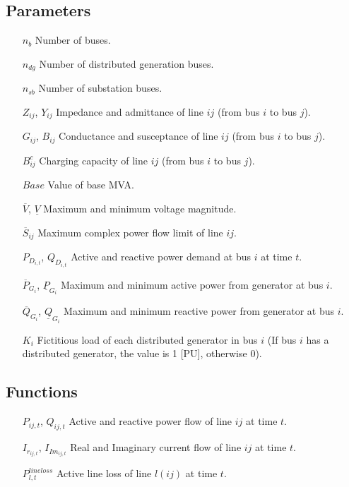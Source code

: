 \documentclass{article}
\begin{document}
\subsection*{Parameters}
\begin{itemize}
\item[$n_{b}$] Number of buses.
\item[$n_{dg}$] Number of distributed generation buses.
\item[$n_{sb}$] Number of substation buses.
\item[$Z_{ij}$, $Y_{ij}$] Impedance and admittance of line $ij$ (from bus $i$ to bus $j$).
\item[$G_{ij}$, $B_{ij}$] Conductance and susceptance of line $ij$ (from bus $i$ to bus $j$).
\item[$B^{c}_{ij}$] Charging capacity of line $ij$ (from bus $i$ to bus $j$).
\item[$Base$] Value of base MVA.
\item[$\overline{V}$, $\underline{V}$] Maximum and minimum voltage magnitude.
\item[$\overline{S}_{ij}$] Maximum complex power flow limit of line $ij$.
\item[$P_{D_{i,t}}$, $Q_{D_{i,t}}$] Active and reactive power demand at bus $i$ at time $t$.
\item[$\overline{P}_{G_{i}}$, $\underline{P}_{G_{i}}$] Maximum and minimum active power from generator at bus $i$.
\item[$\overline{Q}_{G_{i}}$, $\underline{Q}_{G_{i}}$] Maximum and minimum reactive power from generator at bus $i$.
\item[$K_{i}$] Fictitious load of each distributed generator in bus $i$ (If bus $i$ has a distributed generator, the value is 1 [PU], otherwise 0).
\end{itemize}

\subsection*{Functions}
\begin{itemize}
\item[$P_{ij,t}$, $Q_{ij,t}$] Active and reactive power flow of line $ij$ at time $t$.
\item[$I_{r_{ij,t}}$, $I_{Im_{ij,t}}$] Real and Imaginary current flow of line $ij$ at time $t$.
\item[$P^{lineloss}_{l,t}$] Active line loss of line $l(ij)$ at time $t$.
\end{itemize}
\end{document}
